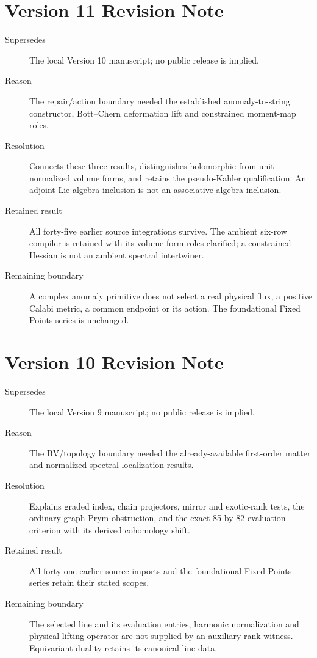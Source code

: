 \documentclass[11pt,a4paper]{article}
\begin{document}
\section*{Version 11 Revision Note}
\begin{description}
\item[Supersedes] The local Version 10 manuscript; no public release is implied.
\item[Reason] The repair/action boundary needed the established anomaly-to-string
constructor, Bott--Chern deformation lift and constrained moment-map roles.
\item[Resolution] Connects these three results, distinguishes holomorphic from
unit-normalized volume forms, and retains the pseudo-Kahler qualification.
An adjoint Lie-algebra inclusion is not an associative-algebra inclusion.
\item[Retained result] All forty-five earlier source integrations survive.
The ambient six-row compiler is retained with its volume-form roles clarified;
a constrained Hessian is not an ambient spectral intertwiner.
\item[Remaining boundary] A complex anomaly primitive does not select a real
physical flux, a positive Calabi metric, a common endpoint or its action.
The foundational Fixed Points series is unchanged.
\end{description}

\section*{Version 10 Revision Note}
\begin{description}
\item[Supersedes] The local Version 9 manuscript; no public release is implied.
\item[Reason] The BV/topology boundary needed the already-available
first-order matter and normalized spectral-localization results.
\item[Resolution] Explains graded index, chain projectors, mirror and
exotic-rank tests, the ordinary graph-Prym obstruction, and the exact
85-by-82 evaluation criterion with its derived cohomology shift.
\item[Retained result] All forty-one earlier source imports and the
foundational Fixed Points series retain their stated scopes.
\item[Remaining boundary] The selected line and its evaluation entries,
harmonic normalization and physical lifting operator are not supplied by
an auxiliary rank witness. Equivariant duality retains its canonical-line data.
\end{description}
\end{document}
